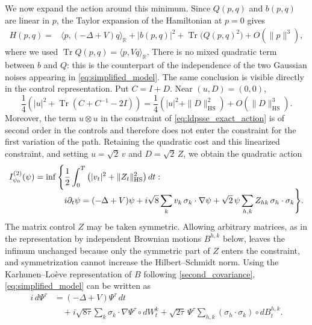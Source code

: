 \documentclass[a4paper,10pt]{amsart}
\newcommand{\R}{\mathbb{R}}
\DeclareMathOperator{\trace}{Tr}
\theoremstyle{remark}
\numberwithin{equation}{section}
\begin{document}
We now expand the action around this minimum. Since $Q(p,q)$ and $b(p,q)$ are linear in $p$, the Taylor expansion of the Hamiltonian at $p=0$ gives
\begin{align}\label{eq:ldpsse_quadratic_hamiltonian}
    H(p,q)
    ={}&\langle p,(-\Delta+V)q\rangle_{\R}
      +| b(p,q)|^2
      +\trace\bigl( Q(p,q)^2\bigr)
      +O(\|p\|^3),
\end{align}
where we used $\trace Q(p,q)=\langle p,Vq\rangle_{\R}$. There is no mixed quadratic term between $ b$ and $Q$: this is the counterpart of the independence of the two Gaussian noises appearing in \eqref{eq:simplified_model}.
The same conclusion is visible directly in the control representation. Put $C=I+D$. Near $(u,D)=(0,0)$,
\begin{equation*}
    \frac14\left(|u|^2+\trace(C+C^{-1}-2I)\right)
    =\frac14\left(|u|^2+\|D\|_{\mathrm{HS}}^2\right)
      +O(\|D\|_{\mathrm{HS}}^3).
\end{equation*}
Moreover, the term $u\otimes u$ in the constraint of
\eqref{eq:ldpsse_exact_action} is of second order in the controls and
therefore does not enter the constraint for the first variation of the
path. Retaining the quadratic cost and this linearized constraint, and
setting $u=\sqrt2\,v$ and $D=\sqrt2\,Z$, we obtain the quadratic action
\begin{align}\label{eq:ldpsse_quadratic_action}
    I^{(2)}_{\psi_0}(\psi)
    =\inf\Bigg\{&\frac12\int_0^T
       \left(|v_t|^2+\|Z_t\|_{\mathrm{HS}}^2\right)dt:\notag\\[-2mm]
       &i\partial_t\psi
       =(-\Delta+V)\psi
        +i\sqrt8\sum_k v_k\,\sigma_k\cdot\nabla\psi
       +\sqrt2\,\psi\sum_{h,k}Z_{hk}\,\sigma_h\cdot\sigma_k
    \Bigg\}.
\end{align}
The matrix control $Z$ may be taken symmetric. Allowing arbitrary matrices, as in the representation by independent Brownian motions $B^{h,k}$ below, leaves the infimum unchanged because only the symmetric part of $Z$ enters the constraint, and symmetrization cannot increase the Hilbert--Schmidt norm. Using the Karhunen--Lo\`eve representation of $B$ following \eqref{second_covariance}, \eqref{eq:simplified_model} can be written as
\begin{align*}
    i\,d\Psi^\tau
    &=(-\Delta+V)\Psi^\tau\,dt\\
    &\quad+i\sqrt{8\tau}\sum_k
    \sigma_k\cdot\nabla\Psi^\tau\circ dW_t^k+\sqrt{2\tau}\,\Psi^\tau
    \sum_{h,k}(\sigma_h\cdot\sigma_k)\circ dB_t^{h,k}.
\end{align*}
\end{document}
